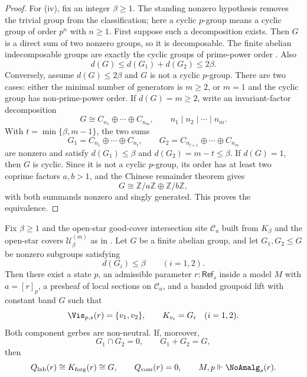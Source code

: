 \begin{proof}
For \textup{(iv)}, fix an integer $\beta\ge1$. The standing nonzero hypothesis removes the trivial group from the classification; here a cyclic $p$-group means a cyclic group of order $p^n$ with $n\ge1$. First suppose such a decomposition exists. Then $G$ is a direct sum of two nonzero groups, so it is decomposable. The finite abelian indecomposable groups are exactly the cyclic groups of prime-power order \cite[Chap.~12]{DummitFoote2004}. Also
\[
d(G)\le d(G_1)+d(G_2)\le 2\beta.
\]
Conversely, assume $d(G)\le2\beta$ and $G$ is not a cyclic $p$-group. There are two cases: either the minimal number of generators is $m\ge2$, or $m=1$ and the cyclic group has non-prime-power order. If $d(G)=m\ge2$, write an invariant-factor decomposition
\[
G\cong C_{n_1}\oplus\cdots\oplus C_{n_m},
\qquad
n_1\mid n_2\mid\cdots\mid n_m.
\]
With $t=\min\{\beta,m-1\}$, the two sums
\[
G_1=C_{n_1}\oplus\cdots\oplus C_{n_t},
\qquad
G_2=C_{n_{t+1}}\oplus\cdots\oplus C_{n_m}
\]
are nonzero and satisfy $d(G_1)\le\beta$ and $d(G_2)=m-t\le\beta$. If $d(G)=1$, then $G$ is cyclic. Since it is not a cyclic $p$-group, its order has at least two coprime factors $a,b>1$, and the Chinese remainder theorem gives
\[
G\cong \mathbb Z/a\mathbb Z\oplus\mathbb Z/b\mathbb Z,
\]
with both summands nonzero and singly generated. This proves the equivalence.
\end{proof}

\begin{lemma}\label{lem:wedge-sphere-mixed-component-transfer}
Fix $\beta\ge 1$ and the open-star good-cover intersection site $\mathcal C_a$ built from
$K_\beta$ and the open-star covers $\mathcal U_\beta^{(m)}$ as in
. Let $G$ be a finite abelian
group, and let $G_1,G_2\le G$ be nonzero subgroups satisfying
\[
d(G_i)\le \beta\qquad(i=1,2).
\]
Then there exist a state $p$, an admissible parameter $r:\mathsf{Ref}_s$
inside a model $M$ with $a=[r]_p$, a presheaf of local sections on
$\mathcal C_a$, and a banded groupoid lift with constant band $G$ such
that
\[
\Vis_{p,s}(r)=\{v_1,v_2\},
\qquad
K_{v_i}=G_i\quad(i=1,2).
\]
Both component gerbes are non-neutral. If, moreover,
\[
G_1\cap G_2=0,\qquad G_1+G_2=G,
\]
then
\[
Q_{\mathrm{lab}}(r)\cong K_{\mathrm{forg}}(r)\cong G,
\qquad
Q_{\mathrm{com}}(r)=0,
\qquad
M,p\Vdash \NoAmalg_s(r).
\]
\end{lemma}

